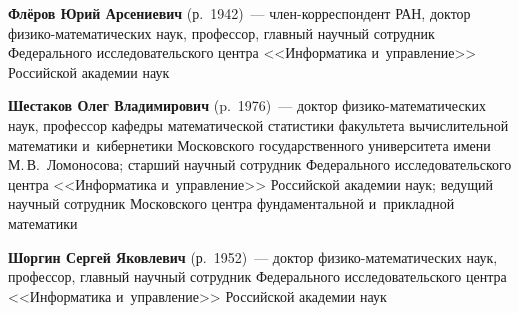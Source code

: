 \begin{multicols}{2}

\columnbreak

\noindent
\textbf{Флёров Юрий Арсениевич} (р.\ 1942)~--- член-кор\-рес\-пон\-дент РАН, доктор фи\-зи\-ко-ма\-те\-ма\-ти\-че\-ских наук, 
профессор, главный научный сотрудник Федерального исследовательского цент\-ра <<Информатика и~управ\-ле\-ние>> Российской академии наук

\vspace*{2pt}

\noindent
\textbf{Шестаков Олег Владимирович} (p.\ 1976)~--- доктор фи\-зи\-ко-ма\-те\-ма\-ти\-че\-ских наук, 
профессор ка\-фед\-ры математической ста\-ти\-сти\-ки факультета вы\-чис\-ли\-тель\-ной математики 
и~кибернетики Московского государственного университета имени М.\,В.~Ломоносова; старший научный сотрудник 
Федерального исследовательского цент\-ра <<Информатика и~управ\-ле\-ние>> Российской академии наук; 
ведущий научный со\-труд\-ник Московского цент\-ра фундаментальной и~при\-клад\-ной математики

\vspace*{2pt}

\noindent
\textbf{Шоргин Сергей Яковлевич} (р.\ 1952)~--- 
доктор фи\-зи\-ко-ма\-те\-ма\-ти\-че\-ских наук, профессор, главный научный сотрудник Федерального исследовательского цент\-ра 
<<Информатика и~управ\-ле\-ние>> Российской академии наук







\def\leftkol{ОБ АВТОРАХ}

\def\rightkol{ОБ АВТОРАХ}


 \label{end\stat}



\end{multicols}

\def\leftkol{ОБ АВТОРАХ}
\def\rightkol{ОБ АВТОРАХ}

\newpage